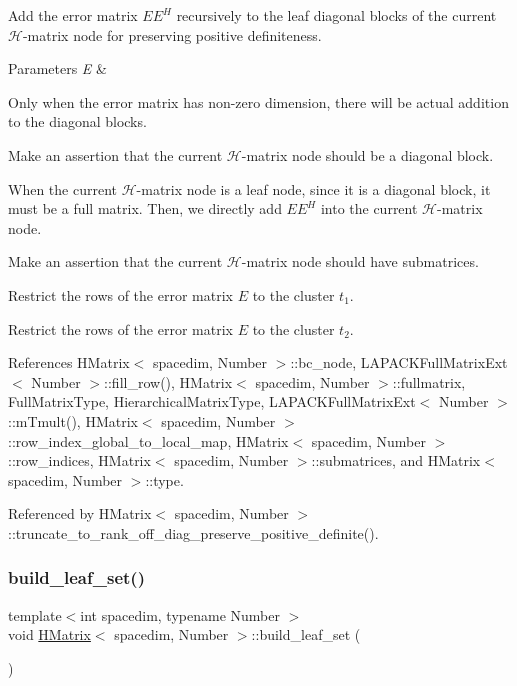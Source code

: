 Add the error matrix $EE^H$ recursively to the leaf diagonal blocks of the current $\mathcal{H}$-\/matrix node for preserving positive definiteness.


\begin{DoxyParams}{Parameters}
{\em E} & \\
\hline
\end{DoxyParams}
Only when the error matrix has non-\/zero dimension, there will be actual addition to the diagonal blocks.

Make an assertion that the current $\mathcal{H}$-\/matrix node should be a diagonal block.

When the current $\mathcal{H}$-\/matrix node is a leaf node, since it is a diagonal block, it must be a full matrix. Then, we directly add $EE^H$ into the current $\mathcal{H}$-\/matrix node.

Make an assertion that the current $\mathcal{H}$-\/matrix node should have submatrices.

Restrict the rows of the error matrix $E$ to the cluster $t_1$.

Restrict the rows of the error matrix $E$ to the cluster $t_2$.

References H\+Matrix$<$ spacedim, Number $>$\+::bc\+\_\+node, L\+A\+P\+A\+C\+K\+Full\+Matrix\+Ext$<$ Number $>$\+::fill\+\_\+row(), H\+Matrix$<$ spacedim, Number $>$\+::fullmatrix, Full\+Matrix\+Type, Hierarchical\+Matrix\+Type, L\+A\+P\+A\+C\+K\+Full\+Matrix\+Ext$<$ Number $>$\+::m\+Tmult(), H\+Matrix$<$ spacedim, Number $>$\+::row\+\_\+index\+\_\+global\+\_\+to\+\_\+local\+\_\+map, H\+Matrix$<$ spacedim, Number $>$\+::row\+\_\+indices, H\+Matrix$<$ spacedim, Number $>$\+::submatrices, and H\+Matrix$<$ spacedim, Number $>$\+::type.



Referenced by H\+Matrix$<$ spacedim, Number $>$\+::truncate\+\_\+to\+\_\+rank\+\_\+off\+\_\+diag\+\_\+preserve\+\_\+positive\+\_\+definite().

\mbox{\label{classHMatrix_a139f32982527ba981e0211b5663e3b43}} 
\subsubsection{\texorpdfstring{build\+\_\+leaf\+\_\+set()}{build\_leaf\_set()}}
{\footnotesize\ttfamily template$<$int spacedim, typename Number $>$ \\
void \hyperlink{classHMatrix}{H\+Matrix}$<$ spacedim, Number $>$\+::build\+\_\+leaf\+\_\+set (\begin{DoxyParamCaption}{ }\end{DoxyParamCaption})}

